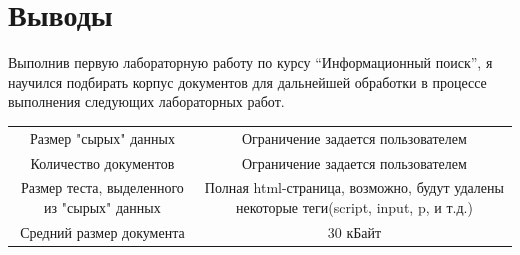 \section{Выводы}

Выполнив первую лабораторную работу по курсу \enquote{Информационный поиск}, я научился подбирать корпус документов для дальнейшей обработки в процессе выполнения следующих лабораторных работ.

\begin{tabular}{|c|c|}
	\hline
	Размер "сырых" данных & Ограничение задается пользователем \\
	Количество документов & Ограничение задается пользователем\\
	Размер теста, выделенного из "сырых" данных & Полная html-страница, возможно, будут удалены некоторые теги(script, input, p, и т.д.)\\
	Средний размер документа & 30 кБайт\\
	
	\hline
\end{tabular}
\pagebreak
